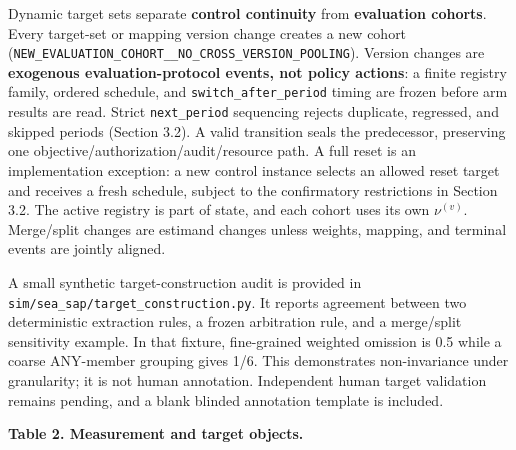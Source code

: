 \documentclass[
  11pt]{article}
\begin{document}
Dynamic target sets separate \textbf{control continuity} from
\textbf{evaluation cohorts}. Every target-set or mapping version change
creates a new cohort
(\texttt{NEW\_EVALUATION\_COHORT\_\_NO\_CROSS\_VERSION\_POOLING}).
Version changes are \textbf{exogenous evaluation-protocol events, not
policy actions}: a finite registry family, ordered schedule, and
\texttt{switch\_after\_period} timing are frozen before arm results are
read. Strict \texttt{next\_period} sequencing rejects duplicate,
regressed, and skipped periods (Section 3.2). A valid transition seals
the predecessor, preserving one objective/authorization/audit/resource
path. A full reset is an implementation exception: a new control
instance selects an allowed reset target and receives a fresh schedule,
subject to the confirmatory restrictions in Section 3.2. The active
registry is part of state, and each cohort uses its own \(\nu^{(v)}\).
Merge/split changes are estimand changes unless weights, mapping, and
terminal events are jointly aligned.

A small synthetic target-construction audit is provided in
\texttt{sim/sea\_sap/target\_construction.py}. It reports agreement
between two deterministic extraction rules, a frozen arbitration rule,
and a merge/split sensitivity example. In that fixture, fine-grained
weighted omission is 0.5 while a coarse ANY-member grouping gives 1/6.
This demonstrates non-invariance under granularity; it is not human
annotation. Independent human target validation remains pending, and a
blank blinded annotation template is included.

\textbf{Table 2. Measurement and target objects.}
\end{document}
